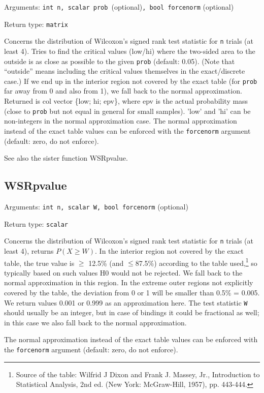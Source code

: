 \documentclass[11pt,english]{article}
\begin{document}
Arguments: \texttt{int n, scalar prob }(optional)\texttt{, bool forcenorm}
(optional)

\noindent Return type: \texttt{matrix}

Concerns the distribution of Wilcoxon's signed rank test statistic for
\texttt{n} trials (at least 4). Tries to find the critical values
(low/hi) where the two-sided area to the outside is as close as
possible to the given \texttt{prob} (default: 0.05). (Note that
``outside'' means including the critical
values themselves in the exact/discrete case.) If we end up in the
interior region not covered by the exact table (for \texttt{prob} far
away from 0 and also from 1), we fall back to the normal
approximation. Returned is col vector \{low; hi; epv\}, where epv is
the actual probability mass (close to \texttt{prob} but not equal in
general for small samples). 'low' and 'hi' can be non-integers in the
normal approximation case. The normal approximation instead of the
exact table values can be enforced with the \texttt{forcenorm}
argument (default: zero, do not enforce).

See also the sister function WSRpvalue.

\subsection{WSRpvalue}

Arguments: \texttt{int n, scalar W, bool forcenorm} (optional)

\noindent Return type: \texttt{scalar}

Concerns the distribution of Wilcoxon's signed rank test statistic for
\texttt{n} trials (at least 4), returns $P(X\geq W)$. In the interior
region not covered by the exact table, the true value is $\geq$ 12.5\%
(and $\leq$87.5\%) according to the table used,\footnote{Source of the
  table: Wilfrid J Dixon and Frank J. Massey, Jr., Introduction to
  Statistical Analysis, 2nd ed. (New York: McGraw-Hill, 1957), pp.
  443-444.} so typically based on such values H0 would not be
rejected. We fall back to the normal approximation in this region. In
the extreme outer regions not explicitly covered by the table, the
deviation from 0 or 1 will be smaller than 0.5\% = 0.005. We return
values 0.001 or 0.999 as an approximation here. The test statistic
\texttt{W} should usually be an integer, but in case of bindings it
could be fractional as well; in this case we also fall back to the
normal approximation.

The normal approximation instead of the exact table values can be
enforced with the \texttt{forcenorm} argument (default: zero, do not
enforce).
\end{document}
